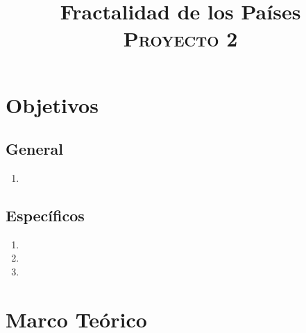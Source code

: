 \documentclass[conference]{IEEEtran}
\begin{document}
\title{Fractalidad de los Países \\
{\footnotesize \scshape{Proyecto 2}}
}

\author{
}



\maketitle

\begin{abstract}

\end{abstract}

\begin{IEEEkeywords}

\end{IEEEkeywords}

\section{Objetivos}

\subsection{General}
    \begin{enumerate}[1.]
        \item 
    \end{enumerate}
\subsection{Específicos}
    \begin{enumerate}
        \item 
        \item 
        \item 
    \end{enumerate}
    
\section{Marco Teórico}
    
\end{document}
